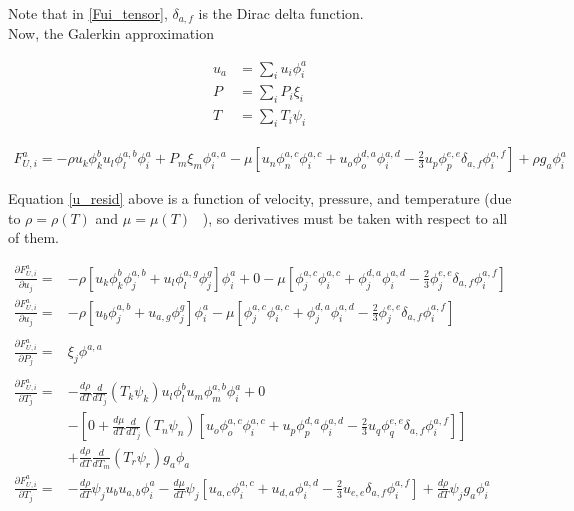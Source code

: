 Note that in \ref{Fui_tensor}, $\delta_{a,f}$ is the Dirac delta function. \\

Now, the Galerkin approximation

\begin{align*}
    u_a &= \sum_i u_i \phi_i^a\\
    P &= \sum_i P_i \xi_i\\
    T &= \sum_i T_i \psi_i
\end{align*}

\begin{align}
    F_{U,i}^a =  -\rho u_k \phi_k^b u_l \phi_l^{a,b} \phi_i^a + P_m \xi_m \phi_i^{a,a} - \mu \left [u_n \phi_n^{a,c} \phi_i^{a,c} + u_o \phi_o^{d,a} \phi_i^{a,d} - \frac{2}{3} u_p \phi_p^{e,e} \delta_{a,f} \phi_i^{a,f} \right ] + \rho g_a \phi_i^a \label{u_resid}
\end{align}

Equation \ref{u_resid} above is a function of velocity, pressure, and temperature (due to $\rho = \rho(T)$ and $\mu = \mu(T)$ \ ), so derivatives must be taken with respect to all of them.

\begin{align}
   \frac{\partial F_{U,i}^a}{\partial u_j} = &-\rho \left [ u_k \phi_k^b \phi_j^{a,b} + u_l \phi_l^{a,g} \phi_j^g \right ] \phi_i^a 
        + 0 - \mu \left [\phi_j^{a,c} \phi_i^{a,c} + \phi_j^{d,a} \phi_i^{a,d} - \frac{2}{3} \phi_j^{e,e} \delta_{a,f} \phi_i^{a,f} \right ] \nonumber \\     
   \frac{\partial F_{U,i}^a}{\partial u_j} = &-\rho \left [ u_b \phi_j^{a,b} + u_{a,g} \phi_j^g \right ] \phi_i^a 
        - \mu \left [\phi_j^{a,c} \phi_i^{a,c} + \phi_j^{d,a} \phi_i^{a,d} - \frac{2}{3} \phi_j^{e,e} \delta_{a,f} \phi_i^{a,f} \right ] \label{du_du} \\
   \nonumber \\ 
   \frac{\partial F_{U,i}^a}{\partial P_j} = &\xi_j \phi^{a,a} \label{du_dp} \\
   \nonumber \\
   \frac{\partial F_{U,i}^a}{\partial T_j} = &-\frac{d\rho}{dT} \frac{d}{dT_j}(T_k \psi_k) u_l \phi_l^b u_m \phi_m^{a,b} \phi_i^a
        + 0 \nonumber \\ &- \left[ 0 + \frac{d\mu}{dT} \frac{d}{dT_j}(T_n \psi_n) [u_o \phi_o^{a,c} \phi_i^{a,c} + u_p \phi_p^{d,a} \phi_i^{a,d} - \frac{2}{3} u_q \phi_q^{e,e} \delta_{a,f} \phi_i^{a,f} ] \right ] \nonumber
        \\ &+ \frac{d\rho}{dT} \frac{d}{dT_m}(T_r \psi_r) g_a \phi_a \nonumber \\       
   \frac{\partial F_{U,i}^a}{\partial T_j} = &-\frac{d\rho}{dT} \psi_j u_b u_{a,b} \phi_i^a
        - \frac{d\mu}{dT} \psi_j \left [u_{a,c} \phi_i^{a,c} + u_{d,a} \phi_i^{a,d} - \frac{2}{3} u_{e,e} \delta_{a,f} \phi_i^{a,f} \right ]
        + \frac{d\rho}{dT} \psi_j g_a \phi_i^a \label{du_dT} 
\end{align}

